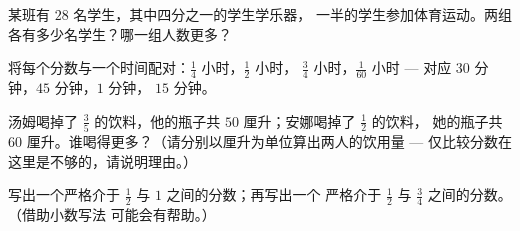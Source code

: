 \begin{exercise}[$\star$]\label{exo:g5:fractions:8}
某班有 $28$ 名学生，其中四分之一的学生学乐器，
一半的学生参加体育运动。两组各有多少名学生？哪一组人数更多？
\end{exercise}

\begin{exercise}[$\star$]\label{exo:g5:fractions:9}
将每个分数与一个时间配对：$\frac14$ 小时，$\frac12$ 小时，
$\frac34$ 小时，$\frac{1}{60}$ 小时 --- 对应 $30$ 分钟，$45$ 分钟，$1$ 分钟，
$15$ 分钟。
\end{exercise}

\begin{exercise}[$\star\star$]\label{exo:g5:fractions:10}
汤姆喝掉了 $\frac35$ 的饮料，他的瓶子共 $50$ 厘升；安娜喝掉了 $\frac12$ 的饮料，
她的瓶子共 $60$ 厘升。谁喝得更多？（请分别以厘升为单位算出两人的饮用量 ---
仅比较分数在这里是不够的，请说明理由。）
\end{exercise}

\begin{exercise}[$\star\star$]\label{exo:g5:fractions:11}
写出一个严格介于 $\frac12$ 与 $1$ 之间的分数；再写出一个
严格介于 $\frac12$ 与 $\frac34$ 之间的分数。（借助小数写法
可能会有帮助。）
\end{exercise}
